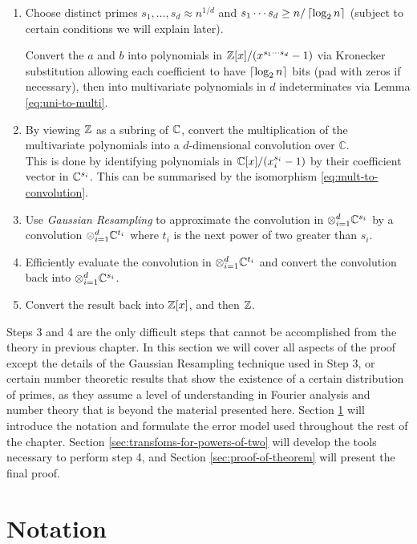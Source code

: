 \begin{enumerate}
    \item  Choose distinct primes $s_1, \ldots, s_d \approx n^{1/d}$ and $s_1\cdots s_d \ge n/\left \lceil \log_2 n \right \rceil$ (subject to certain conditions we will explain later).

        Convert the $a$ and $b$ into polynomials in ${\mathbb Z}[x]/(x^{s_1\cdots s_d} - 1)$ via Kronecker substitution allowing each coefficient to have $\left \lceil \log_2 n \right \rceil$ bits (pad with zeros if necessary), then into multivariate polynomials in $d$ indeterminates via Lemma \ref{eq:uni-to-multi}.
    \item By viewing ${\mathbb Z}$ as a subring of ${\mathbb C}$, convert the multiplication of the multivariate polynomials into a $d$-dimensional convolution over $\mathbb{C}$.\\
        This is done by identifying polynomials in ${\mathbb C}[x]/(x_i^{s_i} - 1)$ by their coefficient vector in ${\mathbb C}^{s_i}$. This can be summarised by the isomorphism \ref{eq:mult-to-convolution}.
    \item Use \emph{Gaussian Resampling} to approximate the convolution in $\otimes_{i=1}^d {\mathbb C}^{s_i}$ by a convolution $\otimes_{i=1}^d {\mathbb C}^{t_i}$ where $t_i$ is the next power of two greater than $s_i$.
    \item Efficiently evaluate the convolution in $\otimes_{i=1}^d {\mathbb C}^{t_i}$ and convert the convolution back into $\otimes_{i=1}^d {\mathbb C}^{s_i}$.
    \item Convert the result back into ${\mathbb Z}[x]$, and then ${\mathbb Z}$.
\end{enumerate}

Steps 3 and 4 are the only difficult steps that cannot be accomplished from the theory in previous chapter. In this section we will cover all aspects of the proof except the details of the Gaussian Resampling technique used in Step 3, or certain number theoretic results that show the existence of a certain distribution of primes, as they assume a level of understanding in Fourier analysis and number theory that is beyond the material presented here. Section \ref{sec:notation} will introduce the notation and formulate the error model used throughout the rest of the chapter. Section \ref{sec:transfoms-for-powers-of-two} will develop the tools necessary to perform step 4, and Section \ref{sec:proof-of-theorem} will present the final proof.

\section{Notation}%
\label{sec:notation}

